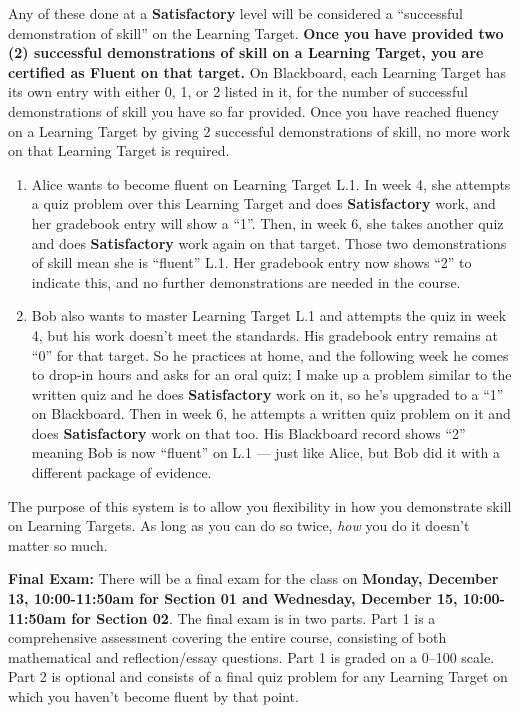 \documentclass[]{article}
\begin{document}
\begin{description}
\begin{itemize}
    \end{itemize}
Any of these done at a \textbf{Satisfactory} level will be considered a ``successful demonstration of skill'' on the Learning Target. \textbf{Once you have provided two (2) successful demonstrations of skill on a Learning Target, you are certified as Fluent on that target.} On Blackboard, each Learning Target has its own entry with either 0, 1, or 2 listed in it, for the number of successful demonstrations of skill you have so far provided. Once you have reached fluency on a Learning Target by giving 2 successful demonstrations of skill, no more work on that Learning Target is required.  
\end{description}

\begin{tcolorbox}[title=Examples, colback=yellow!15!white]
\begin{enumerate}
    \item Alice wants to become fluent on Learning Target L.1. In week 4, she attempts a quiz problem over this Learning Target and does \textbf{Satisfactory} work, and her gradebook entry will show a ``1''. Then, in week 6, she takes another quiz and does \textbf{Satisfactory} work again on that target. Those two demonstrations of skill mean she is ``fluent'' L.1. Her gradebook entry now shows ``2'' to indicate this, and no further demonstrations are needed in the course.  
    \item Bob also wants to master Learning Target L.1 and attempts the quiz in week 4, but his work doesn't meet the standards. His gradebook entry remains at ``0'' for that target. So he practices at home, and the following week he comes to drop-in hours and asks for an oral quiz; I make up a problem similar to the written quiz and he does \textbf{Satisfactory} work on it, so he's upgraded to a ``1'' on Blackboard. Then in week 6, he attempts a written quiz problem on it and does \textbf{Satisfactory} work on that too. His Blackboard record shows ``2'' meaning Bob is now ``fluent'' on L.1 --- just like Alice, but Bob did it with a different package of evidence. 
\end{enumerate}
The purpose of this system is to allow you flexibility in how you demonstrate skill on Learning Targets. As long as you can do so twice, \textit{how} you do it doesn't matter so much. 
\end{tcolorbox}    
    
\textbf{Final Exam:} There will be a final exam for the class on \textbf{Monday, December 13, 10:00-11:50am for Section 01 and Wednesday, December 15, 10:00-11:50am for Section 02}. The final exam is in two parts. Part 1 is a comprehensive assessment covering the entire course, consisting of both mathematical and reflection/essay questions. Part 1 is graded on a 0--100 scale. Part 2 is optional and consists of a final quiz problem for any Learning Target on which you haven't become fluent by that point. 
\end{document}
